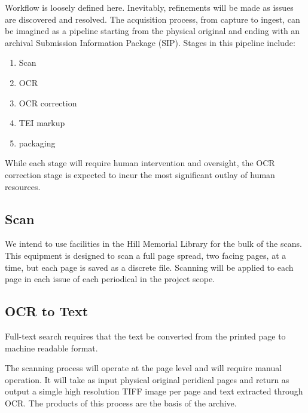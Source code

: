 Workflow is loosely defined here. Inevitably, refinements will be made as issues are discovered and resolved. The acquisition process, from capture to ingest, can be imagined as a pipeline starting from the physical original and ending with an archival Submission Information Package (SIP). Stages in this pipeline include: 
\begin{enumerate}
  \item{Scan}
  \item{OCR}
  \item{OCR correction}
  \item{TEI markup}
  \item{packaging}
\end{enumerate}
While each stage will require human intervention and oversight, the OCR correction stage is expected to incur the most significant outlay of human resources. 
\subsection{Scan}
We intend to use facilities in the Hill Memorial Library for the bulk of the scans. This equipment is designed to scan a full page spread, two facing pages, at a time, but each page is saved as a discrete file. Scanning will be applied to each page in each issue of each periodical in the project scope.
\subsection{OCR to Text}
Full-text search requires that the text be converted from the printed page to machine readable format.


The scanning process will operate at the page level and will require manual operation. It will take as input physical original peridical pages and return as output a simgle high resolution TIFF image per page and text extracted through OCR. The products of this process are the basis of the archive.


